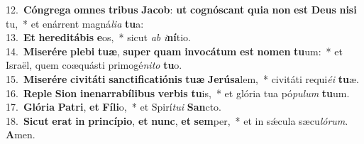 {12.~}\textbf{Cón}\textbf{gre}\textbf{ga} \textbf{om}\textbf{nes} \textbf{tri}\textbf{bus} \textbf{Ja}\textbf{cob}: \textbf{ut} \textbf{co}\textbf{gnó}\textbf{scant} \textbf{qui}\textbf{a} \textbf{non} \textbf{est} \textbf{De}\textbf{us} \textbf{ni}\textbf{si} tu,~* et enárrent magná\textit{li}\textit{a} \textbf{tu}a:\\
{13.~}\textbf{Et} \textbf{he}\textbf{re}\textbf{di}\textbf{tá}\textbf{bis} \textbf{e}os,~* sicut \textit{ab} \textit{i}\textbf{ní}tio.\\
{14.~}\textbf{Mi}\textbf{se}\textbf{ré}\textbf{re} \textbf{ple}\textbf{bi} \textbf{tu}\textbf{æ}, \textbf{su}\textbf{per} \textbf{quam} \textbf{in}\textbf{vo}\textbf{cá}\textbf{tum} \textbf{est} \textbf{no}\textbf{men} \textbf{tu}um:~* et Israël, quem coæquásti primogé\textit{ni}\textit{to} \textbf{tu}o.\\
{15.~}\textbf{Mi}\textbf{se}\textbf{ré}\textbf{re} \textbf{ci}\textbf{vi}\textbf{tá}\textbf{ti} \textbf{san}\textbf{cti}\textbf{fi}\textbf{ca}\textbf{ti}\textbf{ó}\textbf{nis} \textbf{tu}\textbf{æ} \textbf{Je}\textbf{rú}\textbf{sa}lem,~* civitáti requi\textit{é}\textit{i} \textbf{tu}æ.\\
{16.~}\textbf{Re}\textbf{ple} \textbf{Si}\textbf{on} \textbf{i}\textbf{ne}\textbf{nar}\textbf{ra}\textbf{bí}\textbf{li}\textbf{bus} \textbf{ver}\textbf{bis} \textbf{tu}is,~* et glória tua pó\textit{pu}\textit{lum} \textbf{tu}um.\\
{17.~}\textbf{Gló}\textbf{ri}\textbf{a} \textbf{Pa}\textbf{tri}, \textbf{et} \textbf{Fí}\textbf{li}o,~* et Spirí\textit{tu}\textit{i} \textbf{San}cto.\\
{18.~}\textbf{Si}\textbf{cut} \textbf{e}\textbf{rat} \textbf{in} \textbf{prin}\textbf{cí}\textbf{pi}\textbf{o}, \textbf{et} \textbf{nunc}, \textbf{et} \textbf{sem}per,~* et in sǽcula sæcu\textit{ló}\textit{rum}. \textbf{A}men.\\
